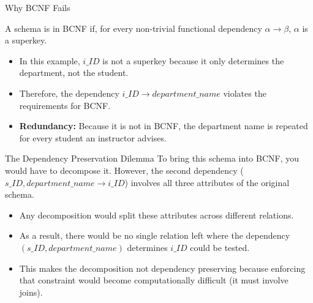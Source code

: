 \documentclass[aspectratio=169]{beamer}
\begin{document}
\begin{frame}{Why BCNF Fails}

    A schema is in BCNF if, for every non-trivial functional dependency $\alpha \rightarrow \beta$, $\alpha$ is a superkey.

    \begin{itemize}
        \item In this example, $i\_ID$ is not a superkey because it only determines the department, not the student.

        \item Therefore, the dependency $i\_ID \rightarrow department\_name$ violates the requirements for BCNF.

        \item \textbf{Redundancy:} Because it is not in BCNF, the department name is repeated for every student an instructor advises.

    \end{itemize}
\end{frame}

\begin{frame}{The Dependency Preservation Dilemma}
    To bring this schema into BCNF, you would have to decompose it. However, the second dependency ($s\_ID, department\_name \rightarrow i\_ID$) involves all three attributes of the original schema.

    \begin{itemize}
        \item Any decomposition would split these attributes across different relations.

        \item As a result, there would be no single relation left where the dependency $(s\_ID, department\_name)$ determines $i\_ID$ could be tested.

        \item This makes the decomposition not dependency preserving because enforcing that constraint would become computationally difficult (it must involve joins).
    \end{itemize}
\end{frame}
\end{document}
